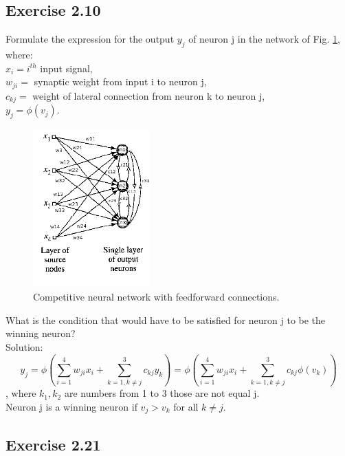 \documentclass[a4paper, 12pt]{article}
\begin{document}
\subsection{Exercise 2.10}

Formulate the expression for the output $y_j$ of neuron j in the network of Fig. \ref{fig:competiotionNN}, where:\\

$x_i = i^{th}$ input signal,\\
$w_{ji} = $ synaptic weight from input i to neuron j,\\
$c_{kj} = $ weight of lateral connection from neuron k to neuron j,\\
$y_j = \phi(v_j)$.\\



\begin{figure}[h]
  \centering
  \caption{Competitive neural network with feedforward connections.\label{fig:competiotionNN}}
  \includegraphics[width=0.4\textwidth]{competiotionNN}
\end{figure}

What is the condition that would have to be satisfied for neuron j to be the winning neuron?\\

Solution:\\

$$y_j = \phi(\sum_{i=1}^{4} w_{ji}x_i  + \sum_{k=1, k \neq j}^{3} c_{kj}y_k) = \phi(\sum_{i=1}^{4} w_{ji}x_i + \sum_{k=1, k \neq j}^{3} c_{kj}\phi(v_k))$$, where $k_1, k_2$ are numbers from 1 to 3 those are not equal j.\\

Neuron j is a winning neuron if $v_j > v_k$ for all $k \neq j$.

\subsection{Exercise 2.21}
\end{document}
